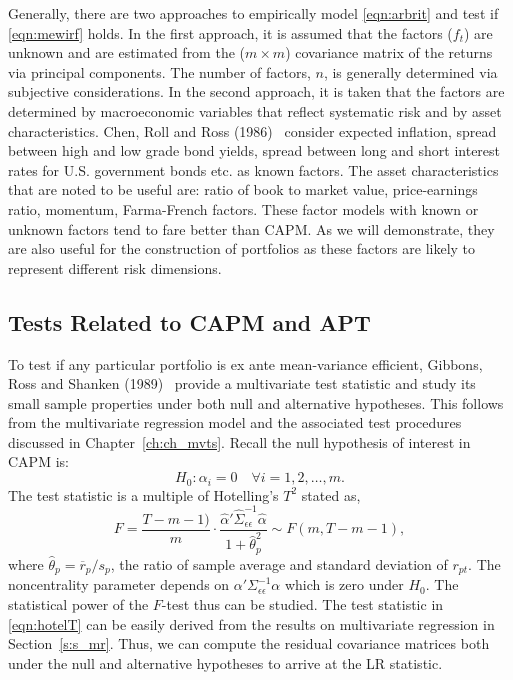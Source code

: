 Generally, there are two approaches to empirically model \eqref{eqn:arbrit} and test if \eqref{eqn:mewirf} holds. In the first approach, it is assumed that the factors ($f_t$) are unknown and are estimated from the ($m \times m$) covariance matrix of the returns via principal components. The number of factors, $n$, is generally determined via subjective considerations. In the second approach, it is taken that the factors are determined by macroeconomic variables that reflect systematic risk and by asset characteristics. Chen, Roll and Ross (1986)~\cite{chenecforce} consider expected inflation, spread between high and low grade bond yields, spread between long and short interest rates for U.S. government bonds etc. as known factors. The asset characteristics that are noted to be useful are: ratio of book to market value, price-earnings ratio, momentum, Farma-French factors. These factor models with known or unknown factors tend to fare better than CAPM. As we will demonstrate, they are also useful for the construction of portfolios as these factors are likely to represent different risk dimensions. 



\subsection{Tests Related to CAPM and APT}


To test if any particular portfolio is ex ante mean-variance efficient, Gibbons, Ross and Shanken (1989)~\cite{gibbons} provide a multivariate test statistic and study its small sample properties under both null and alternative hypotheses. This follows from the multivariate regression model and the associated test procedures discussed in Chapter~\ref{ch:ch_mvts}. Recall the null hypothesis of interest in CAPM is:
	\begin{equation}\label{eqn:secnull}
	H_0: \alpha_i= 0 \quad \forall i= 1, 2, \ldots, m.
	\end{equation}
The test statistic is a multiple of Hotelling's $T^2$ stated as,
	\begin{equation}\label{eqn:hotelT}
	F= \dfrac{T - m - 1)}{m} \cdot \dfrac{\hat{\alpha}' \hat{\Sigma}_{\epsilon\epsilon}^{-1} \hat{\alpha}}{1+\hat{\theta}_p^2} \sim F(m,T - m - 1),
	\end{equation}	
where $\hat{\theta}_p= \overline{r}_p/s_p$, the ratio of sample average and standard deviation of $r_{pt}$. The noncentrality parameter depends on $\alpha' \Sigma_{\epsilon\epsilon}^{-1} \alpha$ which is zero under $H_0$. The statistical power of the $F$-test thus can be studied. The test statistic in \eqref{eqn:hotelT} can be easily derived from the results on multivariate regression in Section~\ref{s:s_mr}. Thus, we can compute the residual covariance matrices both under the null and alternative hypotheses to arrive at the LR statistic. 


